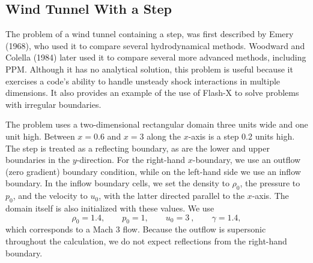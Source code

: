 \vfill
\eject



\newpage
\subsection{Wind Tunnel With a Step}
\label{Sec:SimulationWindTunnel}
The problem of a wind tunnel containing a step,  was first described by
Emery (1968), who used it to compare several hydrodynamical methods.
Woodward and Colella (1984)
later used it to compare several more advanced methods, including PPM.
Although it has no analytical solution, this problem is useful because
it exercises a code's ability to handle unsteady shock interactions
in multiple dimensions. It also provides an example of the use of Flash-X
to solve problems with irregular boundaries.

The problem uses a two-dimensional rectangular domain three units wide
and one unit high. Between $x=0.6$ and $x=3$ along the $x$-axis is a
step 0.2 units high. The step is treated as a reflecting boundary, as
are the lower and upper boundaries in the $y$-direction. For the right-hand
$x$-boundary, we use an outflow (zero gradient) boundary condition, while
on the left-hand side we use an inflow boundary. In the inflow boundary
cells, we set the density to $\rho_0$, the pressure to $p_0$, and the
velocity to $u_0$, with the latter directed parallel to the $x$-axis.
The domain itself is also initialized with these values.
We use
\begin{equation}
\rho_0 = 1.4, \qquad p_0 = 1, \qquad u_0 = 3\ , \qquad \gamma = 1.4,
\end{equation}
which corresponds to a Mach 3 flow. Because the outflow is supersonic
throughout the calculation, we do not expect reflections from the
right-hand boundary.

